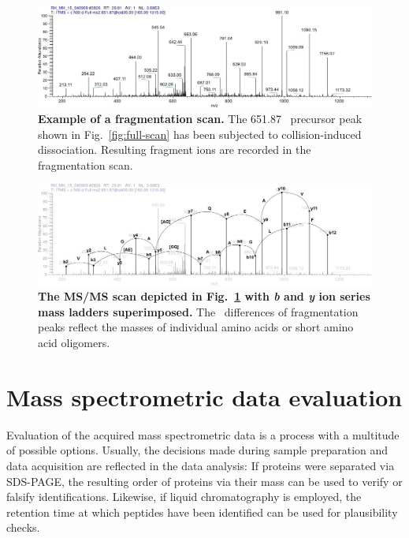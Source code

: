 \begin{figure}[h]
\includegraphics[width=\textwidth]{figures/ms2-scan.jpg}
\caption{
{\bf Example of a fragmentation scan.} 
The 651.87 \mz~precursor peak shown in Fig.~\ref{fig:full-scan} has been
subjected to collision-induced dissociation.
Resulting fragment ions are recorded in the fragmentation scan.
}
\label{fig:fragmentation-scan}
\end{figure}

\begin{figure}[h]
\includegraphics[width=\textwidth]{figures/ms2-scan-b-y-1.jpg}
\caption{
{\bf The MS/MS scan depicted in Fig.~\ref{fig:fragmentation-scan} with {\em b} and 
{\em y} ion series mass ladders superimposed.} 
The \mz~differences of fragmentation peaks reflect the masses of individual amino
acids or short amino acid oligomers.
}
\label{fig:fragmentation-scan-b-y}
\end{figure}


\section{Mass spectrometric data evaluation}

Evaluation of the acquired mass spectrometric data is a process with a multitude
of possible options.
Usually, the decisions made during sample preparation and data acquisition are
reflected in the data analysis: If proteins were separated via SDS-PAGE, the
resulting order of proteins via their mass can be used to verify or falsify 
identifications.
Likewise, if liquid chromatography is employed, the retention time at which
peptides have been identified can be used for plausibility checks.

